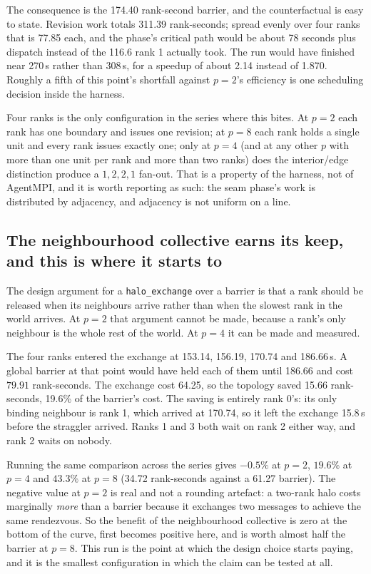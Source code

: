 \documentclass[11pt]{article}
\begin{document}
The consequence is the 174.40 rank-second barrier, and the counterfactual is easy to state.
Revision work totals 311.39 rank-seconds; spread evenly over four ranks that is 77.85 each, and
the phase's critical path would be about 78 seconds plus dispatch instead of the 116.6 rank 1
actually took. The run would have finished near 270\,s rather than 308\,s, for a speedup of
about 2.14 instead of 1.870. Roughly a fifth of this point's shortfall against $p=2$'s efficiency
is one scheduling decision inside the harness.

Four ranks is the only configuration in the series where this bites. At $p=2$ each rank has one
boundary and issues one revision; at $p=8$ each rank holds a single unit and every rank issues
exactly one; only at $p=4$ (and at any other $p$ with more than one unit per rank and more than
two ranks) does the interior/edge distinction produce a $1,2,2,1$ fan-out. That is a property of
the harness, not of AgentMPI, and it is worth reporting as such: the seam phase's work is
distributed by adjacency, and adjacency is not uniform on a line.

\subsection*{The neighbourhood collective earns its keep, and this is where it starts to}

The design argument for a \texttt{halo\_exchange} over a barrier is that a rank should be released
when its neighbours arrive rather than when the slowest rank in the world arrives. At $p=2$ that
argument cannot be made, because a rank's only neighbour is the whole rest of the world. At $p=4$
it can be made and measured.

The four ranks entered the exchange at 153.14, 156.19, 170.74 and 186.66\,s. A global barrier at
that point would have held each of them until 186.66 and cost $79.91$ rank-seconds. The exchange
cost 64.25, so the topology saved 15.66 rank-seconds, 19.6\% of the barrier's cost. The saving is
entirely rank 0's: its only binding neighbour is rank 1, which arrived at 170.74, so it left the
exchange 15.8\,s before the straggler arrived. Ranks 1 and 3 both wait on rank 2 either way, and
rank 2 waits on nobody.

Running the same comparison across the series gives $-0.5\%$ at $p=2$, $19.6\%$ at $p=4$ and
$43.3\%$ at $p=8$ (34.72 rank-seconds against a 61.27 barrier). The negative value at $p=2$ is
real and not a rounding artefact: a two-rank halo costs marginally \emph{more} than a barrier
because it exchanges two messages to achieve the same rendezvous. So the benefit of the
neighbourhood collective is zero at the bottom of the curve, first becomes positive here, and is
worth almost half the barrier at $p=8$. This run is the point at which the design choice starts
paying, and it is the smallest configuration in which the claim can be tested at all.
\end{document}
